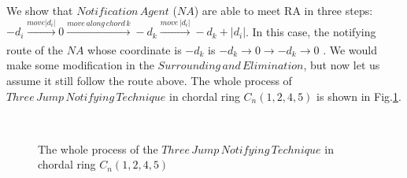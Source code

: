 \documentclass[conference]{IEEEtran}
\begin{document}
We show that $Notification\,Agent$ ($NA$) are able to meet RA in three steps: $-d_i\xrightarrow[]{move\left | d_i \right |}0\xrightarrow[]{move\,along\,chord\,k}-d_k\xrightarrow[]{move\,\left | d_i \right |}-d_k+\left|d_i\right|$. In this case, the notifying route of the $NA$ whose coordinate is $-d_k$ is $-d_k{\rightarrow}0{\rightarrow}-d_k{\rightarrow}0$ . We would make some modification in the $Surrounding\,and\,Elimination$, but now let us assume it still follow the route above. The whole process of $Three\,Jump\,Notifying\,Technique$ in chordal ring $C_n(1, 2, 4, 5)$ is shown in Fig.\ref{fig:subfig}. 

\begin{figure}
  \centering 
  \hspace{1in} 
   \
  \hspace{1in} 
  \hspace{1in} 
  \caption{The whole process of the $Three\,Jump\,Notifying\,Technique$ in chordal ring $C_n(1, 2, 4, 5)$} 
  \label{fig:subfig} %
\end{figure}
\end{document}
